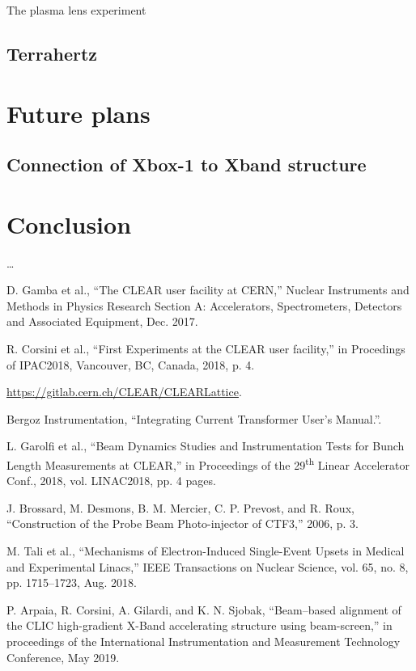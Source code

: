 \documentclass[a4paper,
               keeplastbox,   %
               ]{jacow}
\begin{document}
The plasma lens experiment


\subsection{Terrahertz}


\section{Future plans}

\subsection{Connection of Xbox-1 to Xband structure}

\section{Conclusion}

\ldots

\begin{thebibliography}{9} %
 D. Gamba et al., “The CLEAR user facility at CERN,” Nuclear Instruments and Methods in Physics Research Section A: Accelerators, Spectrometers, Detectors and Associated Equipment, Dec. 2017.

 R. Corsini et al., “First Experiments at the CLEAR user facility,” in Procedings of IPAC2018, Vancouver, BC, Canada, 2018, p. 4.

 \url{https://gitlab.cern.ch/CLEAR/CLEARLattice}.

 Bergoz Instrumentation, “Integrating Current Transformer User’s Manual.”.

 L. Garolfi et al., “Beam Dynamics Studies and Instrumentation Tests for Bunch Length Measurements at CLEAR,” in Proceedings of the 29\textsuperscript{th} Linear Accelerator Conf., 2018, vol. LINAC2018, pp. 4 pages.

 J. Brossard, M. Desmons, B. M. Mercier, C. P. Prevost, and R. Roux, “Construction of the Probe Beam Photo-injector of CTF3,” 2006, p. 3.

 M. Tali et al., “Mechanisms of Electron-Induced Single-Event Upsets in Medical and Experimental Linacs,” IEEE Transactions on Nuclear Science, vol. 65, no. 8, pp. 1715–1723, Aug. 2018.

 P. Arpaia, R. Corsini, A. Gilardi, and K. N. Sjobak, “Beam–based alignment of the CLIC high-gradient X-Band accelerating structure using beam-screen,” in proceedings of the International Instrumentation and Measurement Technology Conference, May 2019.

\end{thebibliography}
\end{document}
